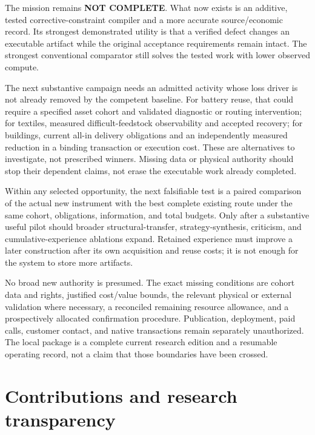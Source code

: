 The mission remains \textbf{NOT COMPLETE}. What now exists is an
additive, tested corrective-constraint compiler and a more accurate
source/economic record. Its strongest demonstrated utility is that a
verified defect changes an executable artifact while the original
acceptance requirements remain intact. The strongest conventional
comparator still solves the tested work with lower observed compute.

The next substantive campaign needs an admitted activity whose loss
driver is not already removed by the competent baseline. For battery
reuse, that could require a specified asset cohort and validated
diagnostic or routing intervention; for textiles, measured
difficult-feedstock observability and accepted recovery; for buildings,
current all-in delivery obligations and an independently measured
reduction in a binding transaction or execution cost. These are
alternatives to investigate, not prescribed winners. Missing data or
physical authority should stop their dependent claims, not erase the
executable work already completed.

Within any selected opportunity, the next falsifiable test is a paired
comparison of the actual new instrument with the best complete existing
route under the same cohort, obligations, information, and total
budgets. Only after a substantive useful pilot should broader
structural-transfer, strategy-synthesis, criticism, and
cumulative-experience ablations expand. Retained experience must improve
a later construction after its own acquisition and reuse costs; it is
not enough for the system to store more artifacts.

No broad new authority is presumed. The exact missing conditions are
cohort data and rights, justified cost/value bounds, the relevant
physical or external validation where necessary, a reconciled remaining
resource allowance, and a prospectively allocated confirmation
procedure. Publication, deployment, paid calls, customer contact, and
native transactions remain separately unauthorized. The local package is
a complete current research edition and a resumable operating record,
not a claim that those boundaries have been crossed.


\section*{Contributions and research transparency}\label{contributions}

